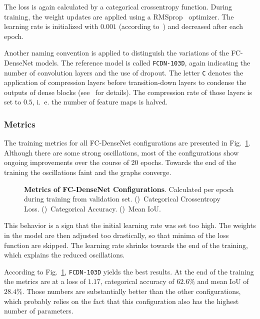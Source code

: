 The loss is again calculated by a categorical crossentropy function. During training, the weight updates are applied using a RMSprop~\cite{rmsprop14} optimizer. The learning rate is initialized with $0.001$ (according to~\cite{denseseg17}) and decreased after each epoch.

Another naming convention is applied to distinguish the variations of the FC-DenseNet models. The reference model is called \texttt{FCDN-103D}, again indicating the number of convolution layers and the use of dropout. The letter \texttt{C} denotes the application of compression layers before transition-down layers to condense the outputs of dense blocks (see~\cite{denseseg17} for details). The compression rate of those layers is set to $0.5$, i.~e. the number of feature maps is halved.

\subsubsection{Metrics}
The training metrics for all FC-DenseNet configurations are presented in Fig.~\ref{fig:densenet_train_metrics}. Although there are some strong oscillations, most of the configurations show ongoing improvements over the course of 20 epochs. Towards the end of the training the oscillations faint and the graphs converge.

\begin{figure}[h]
    \newcommand{\DensenetMetricsImageWidth}{0.32\textwidth}
    \centering
            
    \caption[Metrics of FC-DenseNet Configurations]
    {\textbf{Metrics of FC-DenseNet Configurations}. Calculated per epoch during training from validation set. ()~Categorical Crossentropy Loss. ()~Categorical Accuracy. ()~Mean IoU.}
    \label{fig:densenet_train_metrics}
\end{figure}

This behavior is a sign that the initial learning rate was set too high. The weights in the model are then adjusted too drastically, so that minima of the loss function are skipped. The learning rate shrinks towards the end of the training, which explains the reduced oscillations.

According to Fig.~\ref{fig:densenet_train_metrics}, \texttt{FCDN-103D} yields the best results. At the end of the training the metrics are at a loss of $1.17$, categorical accuracy of $62.6\%$ and mean IoU of $28.4\%$. Those numbers are substantially better than the other configurations, which probably relies on the fact that this configuration also has the highest number of parameters.

